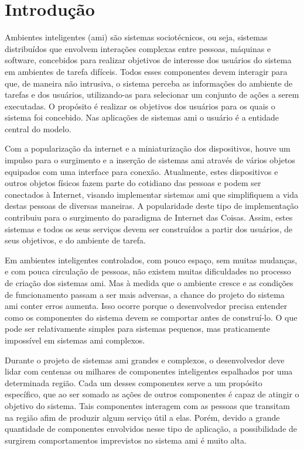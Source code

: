 \chapter{Introdução}
\label{cap:introducao}
    
    Ambientes inteligentes (\acrshort{ami}) são sistemas sociotécnicos, ou seja, sistemas distribuídos que envolvem interações complexas entre pessoas, máquinas e software, concebidos para realizar objetivos de interesse dos usuários do sistema em ambientes de tarefa difíceis. Todos esses componentes devem interagir para que, de maneira não intrusiva, o sistema perceba as informações do ambiente de tarefas e dos usuários, utilizando-as para selecionar um conjunto de ações a serem executadas. O propósito é realizar os objetivos dos usuários para os quais o sistema foi concebido. Nas aplicações de sistemas \acrshort{ami} o usuário é a entidade central do modelo. 
   
    Com a popularização da internet e a miniaturização dos dispositivos, houve um impulso para o surgimento e a inserção de sistemas \acrshort{ami} através de vários objetos equipados com uma interface para conexão. Atualmente, estes dispositivos e outros objetos físicos fazem parte do cotidiano das pessoas e podem ser conectados à Internet, visando implementar sistemas \acrshort{ami} que simplifiquem a vida destas pessoas de diversas maneiras. A popularidade deste tipo de implementação contribuiu para o surgimento do paradigma de Internet das Coisas. Assim, estes sistemas e todos os seus serviços devem ser construídos a partir dos usuários, de seus objetivos, e do ambiente de tarefa.
    
    Em ambientes inteligentes controlados, com pouco espaço, sem muitas mudanças, e com pouca circulação de pessoas, não existem muitas dificuldades no processo de criação dos sistemas \acrshort{ami}. Mas à medida que o ambiente cresce e as condições de funcionamento passam a ser mais adversas, a chance do projeto do sistema \acrshort{ami} conter erros aumenta. Isso ocorre porque o desenvolvedor precisa entender como os componentes do sistema devem se comportar antes de construí-lo. O que pode ser relativamente simples para sistemas pequenos, mas praticamente impossível em sistemas \acrshort{ami} complexos. 
    
    Durante o projeto de sistemas \acrshort{ami} grandes e complexos, o desenvolvedor deve lidar com centenas ou milhares de componentes inteligentes espalhados por uma determinada região. Cada um  desses componentes serve a um propósito específico, que ao ser somado as ações de outros componentes é capaz de atingir o objetivo do sistema. Tais componentes interagem com as pessoas que transitam na região afim de produzir algum serviço útil a elas. Porém, devido a grande quantidade de componentes envolvidos nesse tipo de aplicação, a possibilidade de surgirem comportamentos imprevistos no sistema \acrshort{ami} é muito alta. 
    
